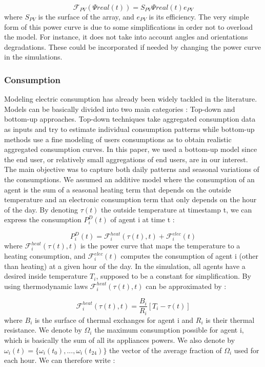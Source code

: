 \documentclass[journal]{IEEEtran}
\begin{document}
\begin{equation}
\mathcal{F}_{PV}(\Psi{real}(t)) =  S_{PV} \Psi{real}(t)  e_{PV}
\end{equation}
where $ S_{PV} $ is the surface of the array, and $ e_{PV} $ is its efficiency. The very simple form of this power curve is due to some simplifications in order not to overload the model. For instance, it does not take into account angles and orientations degradations. These could be incorporated if needed by changing the power curve in the simulations.

\subsubsection{Consumption}
Modeling electric consumption has already been widely tackled in the literature. Models can be basically divided into two main categories : Top-down and bottom-up approaches. Top-down techniques take aggregated consumption data as inputs and try to estimate individual consumption patterns while bottom-up methods use a fine modeling of users consumptions as to obtain realistic aggregated consumption curves. In this paper, we used a bottom-up model since the end user, or relatively small aggregations of end users, are in our interest. The main objective was to capture both daily patterns and seasonal variations of the consumptions. We assumed an additive model where the consumption of an agent is the sum of a seasonal heating term that depends on the outside temperature and an electronic consumption term that only depends on the hour of the day. By denoting $ \tau(t) $ the outside temperature at timestamp t, we can express the consumption $ P_{i}^{D}(t) $ of agent i at time t :

\begin{equation}
P_{i}^{D}(t) = \mathcal{F}_{i}^{heat}(\tau(t), t) + \mathcal{F}_{i}^{elec}(t)
\end{equation}
where $ \mathcal{F}_{i}^{heat}(\tau(t), t) $ is the power curve that maps the temperature to a heating consumption, and $ \mathcal{F}_{i}^{elec}(t) $ computes the consumption of agent i (other than heating) at a given hour of the day. In the simulation, all agents have a desired inside temperature $ T_{i} $, supposed to be a constant for simplification. By using thermodynamic laws $ \mathcal{F}_{i}^{heat}(\tau(t), t) $ can be approximated by :

\begin{equation}
\mathcal{F}_{i}^{heat}(\tau(t), t) = \dfrac{B_{i}}{R_{i}} \left[ T_{i} - \tau(t) \right]
\end{equation}
where $ B_{i} $ is the surface of thermal exchanges for agent i and $ R_{i} $ is their thermal resistance. We denote by $ \Omega_{i} $ the maximum consumption possible for agent i, which is basically the sum of all its appliances powers. We also denote by $ \omega_{i}(t) = \{ \omega_{i}(t_{0}),...,\omega_{i}(t_{24}) \} $ the vector of the average fraction of $ \Omega_{i} $ used for each hour. We can therefore write :
\end{document}
